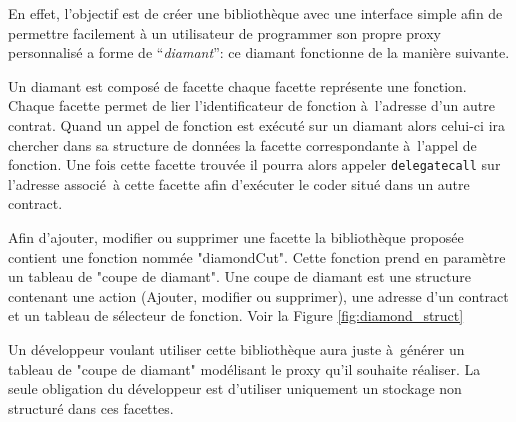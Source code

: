 En effet, l'objectif est de créer une bibliothèque avec une interface simple afin de permettre facilement à un
utilisateur de programmer son propre proxy personnalisé a forme de ``\emph{diamant}'': ce diamant fonctionne de la manière suivante.

Un diamant est composé de facette chaque facette représente une fonction. Chaque facette permet de lier l'identificateur
de fonction à l'adresse d'un autre contrat. Quand un appel de fonction est exécuté sur un diamant alors celui-ci ira chercher
dans sa structure de données la facette correspondante à l'appel de fonction. Une fois cette facette trouvée il pourra alors
appeler \texttt{delegatecall} sur l'adresse associé à cette facette afin d'exécuter le coder situé dans un autre contract.

Afin d'ajouter, modifier ou supprimer une facette la bibliothèque proposée contient une fonction nommée "diamondCut". Cette fonction prend en paramètre un tableau de "coupe de diamant". Une coupe de diamant est une structure contenant
une action (Ajouter, modifier ou supprimer), une adresse d'un contract et un tableau de sélecteur de fonction. Voir la Figure
\ref{fig:diamond_struct}

Un développeur voulant utiliser cette bibliothèque aura juste à générer un tableau de "coupe de diamant" modélisant le 
proxy qu'il souhaite réaliser. La seule obligation du développeur est d'utiliser uniquement un stockage non structuré dans
ces facettes.

